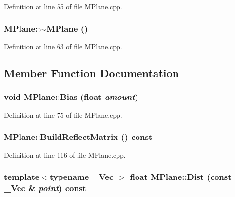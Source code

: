 Definition at line 55 of file MPlane.cpp.\hypertarget{class_m_plane_5c9992f6d3f481962e666995a7cc4198}{
\subsubsection[{$\sim$MPlane}]{\setlength{\rightskip}{0pt plus 5cm}MPlane::$\sim$MPlane ()}}
\label{class_m_plane_5c9992f6d3f481962e666995a7cc4198}




Definition at line 63 of file MPlane.cpp.

\subsection{Member Function Documentation}
\hypertarget{class_m_plane_d04872aec9db1ff0a6625fac675783ad}{
\subsubsection[{Bias}]{\setlength{\rightskip}{0pt plus 5cm}void MPlane::Bias (float {\em amount})}}
\label{class_m_plane_d04872aec9db1ff0a6625fac675783ad}




Definition at line 75 of file MPlane.cpp.\hypertarget{class_m_plane_22103668bd272f9ed1dc42f8e5a30cd2}{
\subsubsection[{BuildReflectMatrix}]{ MPlane::BuildReflectMatrix () const}}
\label{class_m_plane_22103668bd272f9ed1dc42f8e5a30cd2}




Definition at line 116 of file MPlane.cpp.\hypertarget{class_m_plane_f36d81e75e651ca9a3004e1cb14d4217}{
\subsubsection[{Dist}]{\setlength{\rightskip}{0pt plus 5cm}template$<$typename \_\-Vec $>$ float MPlane::Dist (const \_\-Vec \& {\em point}) const}}
\label{class_m_plane_f36d81e75e651ca9a3004e1cb14d4217}




